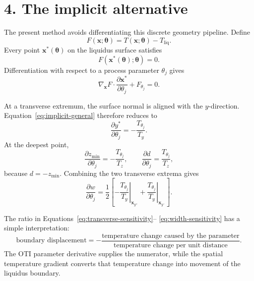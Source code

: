 \documentclass[12pt]{article}
\begin{document}
\section*{4. The implicit alternative}

The present method avoids differentiating this discrete geometry pipeline.
Define
\begin{equation}
  F(\mathbf{x};\boldsymbol{\theta})
  =T(\mathbf{x};\boldsymbol{\theta})-T_{\mathrm{liq}}.
\end{equation}
Every point $\mathbf{x}^*(\boldsymbol{\theta})$ on the liquidus surface
satisfies
\begin{equation}
  F(\mathbf{x}^*(\boldsymbol{\theta});\boldsymbol{\theta})=0.
\end{equation}
Differentiation with respect to a process parameter $\theta_j$ gives
\begin{equation}
  \nabla_{\mathbf{x}}F\mathbin{\cdot}
  \frac{\partial\mathbf{x}^*}{\partial\theta_j}
  +F_{\theta_j}=0.
  \label{eq:implicit-general}
\end{equation}

At a transverse extremum, the surface normal is aligned with the
$y$-direction. Equation~\eqref{eq:implicit-general} therefore reduces to
\begin{equation}
  \frac{\partial y^*}{\partial\theta_j}
  =-\frac{T_{\theta_j}}{T_y}.
  \label{eq:transverse-sensitivity}
\end{equation}
At the deepest point,
\begin{equation}
  \frac{\partial z_{\min}}{\partial\theta_j}
  =-\frac{T_{\theta_j}}{T_z},
  \qquad
  \frac{\partial d}{\partial\theta_j}
  =\frac{T_{\theta_j}}{T_z},
  \label{eq:depth-sensitivity}
\end{equation}
because $d=-z_{\min}$. Combining the two transverse extrema gives
\begin{equation}
  \frac{\partial w}{\partial\theta_j}
  =\frac{1}{2}
  \left[
    -\left.\frac{T_{\theta_j}}{T_y}\right|_{\mathbf{x}_{y^+}}
    +\left.\frac{T_{\theta_j}}{T_y}\right|_{\mathbf{x}_{y^-}}
  \right].
  \label{eq:width-sensitivity}
\end{equation}

The ratio in Equations~\eqref{eq:transverse-sensitivity}--
\eqref{eq:width-sensitivity} has a simple interpretation:
\begin{equation}
  \text{boundary displacement}
  =-\frac{\text{temperature change caused by the parameter}}
          {\text{temperature change per unit distance}}.
\end{equation}
The OTI parameter derivative supplies the numerator, while the spatial
temperature gradient converts that temperature change into movement of the
liquidus boundary.
\end{document}
